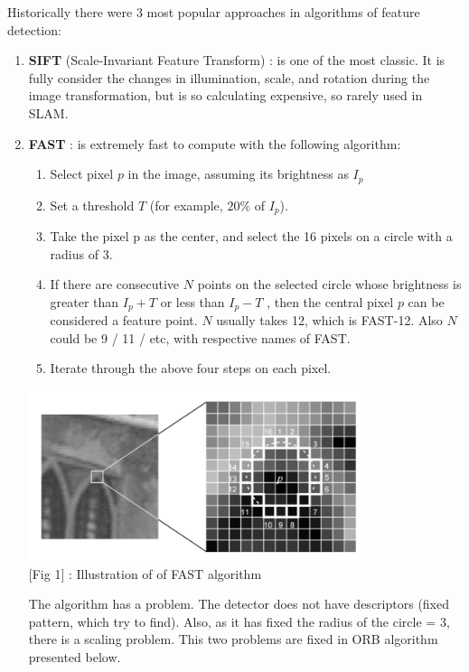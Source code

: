 Historically there were 3 most popular approaches in algorithms of feature detection:
\begin{enumerate}
    \item {\bf  SIFT} (Scale-Invariant Feature Transform) : is one of the most classic. It is fully consider the changes in illumination, scale, and rotation during the image transformation, but is so calculating expensive, so rarely used in SLAM.

    \item {\bf FAST} : is extremely fast to compute with the following algorithm:
    \begin{enumerate}
        \item Select pixel $p$ in the image, assuming its brightness as $I_p$
        \item Set a threshold $T$ (for example, $20\%$ of $I_p$).
        \item Take the pixel p as the center, and select the 16 pixels on a circle with a radius of 3.
        \item If there are consecutive $N$ points on the selected circle whose brightness is greater than $I_p+T$ or less than $I_p−T$ , then the central pixel $p$ can be considered a feature point. $N$ usually takes 12, which is {\br FAST-12}. Also $N$ could be 9 / 11 / etc, with respective names of FAST.
        \item Iterate through the above four steps on each pixel.
    \end{enumerate}
    \begin{center}
        \includegraphics[height=5cm]{FAST_example.png}\\[1cm]
        [Fig 1] : Illustration of of FAST algorithm 
    \end{center}
    The algorithm has a problem. The detector does not have descriptors (fixed pattern, which try to find). Also, as it has fixed the radius of the circle = 3, there is a scaling problem. This two problems are fixed in ORB algorithm presented below.
    

\end{enumerate}
